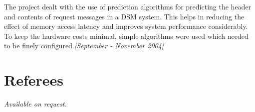 \documentclass[margin,line]{resume}
\begin{document}
\begin{resume}
	The project dealt with the use of prediction algorithms for predicting the header and contents of request messages in a DSM system. This helps in reducing the effect of memory access latency and improves system performance considerably. To keep the hardware costs minimal, simple algorithms were used which needed to be finely configured.\hfill \emph{[September - November 2004]}
	\section{\mysidestyle Referees}
	{\sl Available on request.}

	\end{resume}
	
\end{document}

